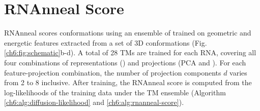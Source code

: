 
\section{RNAnneal Score}
{}
\label{ch6:sec:rnanneal}

RNAnneal scores conformations using an ensemble of  trained on geometric and energetic features extracted from a set of 3D conformations (Fig. \ref{ch6:fig:schematic}b-d). A total of 28 TMs are trained for each RNA, covering all four combinations of representations () and projections (PCA and ). For each feature-projection combination, the number of projection components $d$ varies from 2 to 8 inclusive. After training, the RNAnneal score is computed from the log-likelihoods of the training data under the TM ensemble (Algorithm \ref{ch6:alg:diffusion-likelihood} and \ref{ch6:alg:rnanneal-score}).

